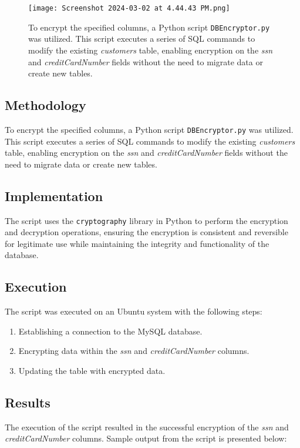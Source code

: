 \documentclass{article}
\begin{document}


\begin{figure}[H]
    \centering
    \texttt{[image: Screenshot 2024-03-02 at 4.44.43 PM.png]}
    \caption{To encrypt the specified columns, a Python script \texttt{DBEncryptor.py} was utilized. This script executes a series of SQL commands to modify the existing \textit{customers} table, enabling encryption on the \textit{ssn} and \textit{creditCardNumber} fields without the need to migrate data or create new tables.}
\end{figure}

%

\subsection*{Methodology}
To encrypt the specified columns, a Python script \texttt{DBEncryptor.py} was utilized. This script executes a series of SQL commands to modify the existing \textit{customers} table, enabling encryption on the \textit{ssn} and \textit{creditCardNumber} fields without the need to migrate data or create new tables.

\subsection*{Implementation}
The script uses the \texttt{cryptography} library in Python to perform the encryption and decryption operations, ensuring the encryption is consistent and reversible for legitimate use while maintaining the integrity and functionality of the database.

\subsection*{Execution}
The script was executed on an Ubuntu system with the following steps:
\begin{enumerate}
    \item Establishing a connection to the MySQL database.
    \item Encrypting data within the \textit{ssn} and \textit{creditCardNumber} columns.
    \item Updating the table with encrypted data.
\end{enumerate}

\subsection*{Results}
The execution of the script resulted in the successful encryption of the \textit{ssn} and \textit{creditCardNumber} columns. Sample output from the script is presented below:
\end{document}
